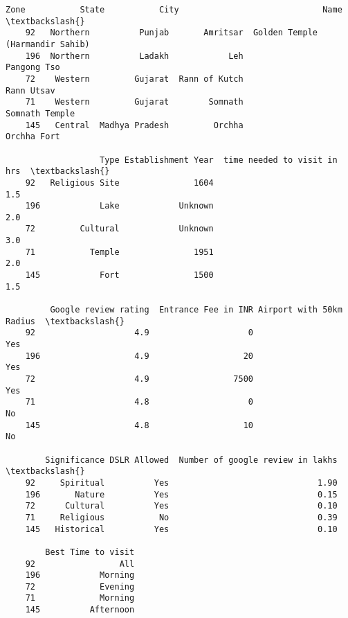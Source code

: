 \documentclass[11pt]{article}
\makeatletter
\newcommand{\boxspacing}{\kern\kvtcb@left@rule\kern\kvtcb@boxsep}
\newcommand{\prompt}[4]{
        {\ttfamily\llap{{\color{#2}[#3]:\hspace{3pt}#4}}\vspace{-\baselineskip}}
    }
\makeatother
\begin{document}
                \begin{tcolorbox}[breakable, size=fbox, boxrule=.5pt, pad at break*=1mm, opacityfill=0]
    \prompt{Out}{outcolor}{34}{\boxspacing}
    \begin{Verbatim}[commandchars=\\\{\}]
             Zone           State           City                             Name  \textbackslash{}
    92   Northern          Punjab       Amritsar  Golden Temple (Harmandir Sahib)
    196  Northern          Ladakh            Leh                      Pangong Tso
    72    Western         Gujarat  Rann of Kutch                       Rann Utsav
    71    Western         Gujarat        Somnath                   Somnath Temple
    145   Central  Madhya Pradesh         Orchha                      Orchha Fort
    
                   Type Establishment Year  time needed to visit in hrs  \textbackslash{}
    92   Religious Site               1604                          1.5
    196            Lake            Unknown                          2.0
    72         Cultural            Unknown                          3.0
    71           Temple               1951                          2.0
    145            Fort               1500                          1.5
    
         Google review rating  Entrance Fee in INR Airport with 50km Radius  \textbackslash{}
    92                    4.9                    0                      Yes
    196                   4.9                   20                      Yes
    72                    4.9                 7500                      Yes
    71                    4.8                    0                       No
    145                   4.8                   10                       No
    
        Significance DSLR Allowed  Number of google review in lakhs  \textbackslash{}
    92     Spiritual          Yes                              1.90
    196       Nature          Yes                              0.15
    72      Cultural          Yes                              0.10
    71     Religious           No                              0.39
    145   Historical          Yes                              0.10
    
        Best Time to visit
    92                 All
    196            Morning
    72             Evening
    71             Morning
    145          Afternoon
    \end{Verbatim}
    \end{tcolorbox}
            
\end{document}
